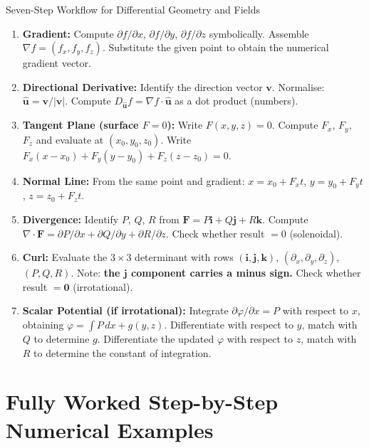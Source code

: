 \documentclass[12pt,a4paper]{article}
\begin{document}
\begin{infobox}{Seven-Step Workflow for Differential Geometry and Fields}
\begin{enumerate}[leftmargin=*, label=\textbf{Step \arabic*.}]
  \item \textbf{Gradient:} Compute $\partial f/\partial x$, $\partial f/\partial y$, $\partial f/\partial z$ symbolically. Assemble $\nabla f = (f_x, f_y, f_z)$. Substitute the given point to obtain the numerical gradient vector.
  \item \textbf{Directional Derivative:} Identify the direction vector $\mathbf{v}$. Normalise: $\hat{\mathbf{u}} = \mathbf{v}/|\mathbf{v}|$. Compute $D_{\hat{\mathbf{u}}} f = \nabla f \cdot \hat{\mathbf{u}}$ as a dot product (numbers).
  \item \textbf{Tangent Plane (surface $F = 0$):} Write $F(x,y,z) = 0$. Compute $F_x$, $F_y$, $F_z$ and evaluate at $(x_0, y_0, z_0)$. Write $F_x(x - x_0) + F_y(y - y_0) + F_z(z - z_0) = 0$.
  \item \textbf{Normal Line:} From the same point and gradient: $x = x_0 + F_x t$,\; $y = y_0 + F_y t$,\; $z = z_0 + F_z t$.
  \item \textbf{Divergence:} Identify $P$, $Q$, $R$ from $\mathbf{F} = P\mathbf{i}+Q\mathbf{j}+R\mathbf{k}$. Compute $\nabla \cdot \mathbf{F} = \partial P/\partial x + \partial Q/\partial y + \partial R/\partial z$. Check whether result $= 0$ (solenoidal).
  \item \textbf{Curl:} Evaluate the $3 \times 3$ determinant with rows $(\mathbf{i},\mathbf{j},\mathbf{k})$, $(\partial_x, \partial_y, \partial_z)$, $(P, Q, R)$. Note: \textbf{the $\mathbf{j}$ component carries a minus sign.} Check whether result $= \mathbf{0}$ (irrotational).
  \item \textbf{Scalar Potential (if irrotational):} Integrate $\partial \varphi/\partial x = P$ with respect to $x$, obtaining $\varphi = \int P\, dx + g(y,z)$. Differentiate with respect to $y$, match with $Q$ to determine $g$. Differentiate the updated $\varphi$ with respect to $z$, match with $R$ to determine the constant of integration.
\end{enumerate}
\end{infobox}

\section{Fully Worked Step-by-Step Numerical Examples}
\end{document}
